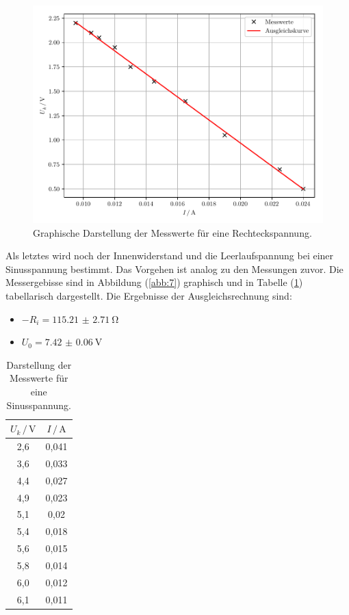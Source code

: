 \begin{figure}[H]
  \centering
  \includegraphics{plot3.pdf}
  \caption{Graphische Darstellung der Messwerte für eine Rechteckspannung.}
  \label{abb:6}
\end{figure}

Als letztes wird noch der Innenwiderstand und die Leerlaufspannung bei einer Sinusspannung
bestimmt. Das Vorgehen ist analog zu den Messungen zuvor. Die Messergebisse sind
in Abbildung (\ref{abb:7}) graphisch und in Tabelle (\ref{tab:4}) tabellarisch
dargestellt. Die Ergebnisse der Ausgleichsrechnung sind:

\begin{itemize}
  \item $-R_i = \SI{115.21(271)}{\ohm}$
  \item $U_0 = \SI{7.42(6)}{\volt}$
\end{itemize}

\begin{table}[H]
  \centering
  \caption{Darstellung der Messwerte für eine Sinusspannung.}
  \label{tab:4}
  \begin{tabular}{c c}
    \toprule
    $U_k \, / \, \si{\volt}$ & $ I \, / \, \si{\ampere}$ \\
    \midrule
    2,6 & 0,041 \\
    3,6 & 0,033 \\
    4,4 & 0,027 \\
    4,9 & 0,023 \\
    5,1 & 0,02  \\
    5,4 & 0,018 \\
    5,6 & 0,015 \\
    5,8 & 0,014 \\
    6,0 & 0,012 \\
    6,1 & 0,011 \\
    \bottomrule
  \end{tabular}
\end{table}

